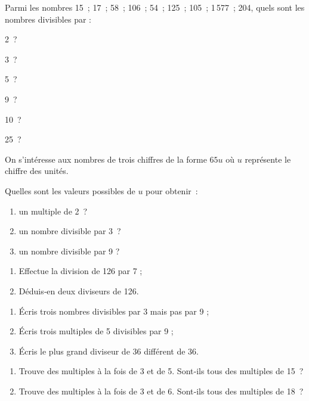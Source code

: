 \begin{exercice}
Parmi les nombres 15 ; 17 ; 58 ; 106 ; 54 ; 125 ; 105 ; 1\,577 ; 204, quels sont les nombres divisibles par :
\begin{colenumerate}{3}     
 \item 2 ?
 \item 3 ?
 \item 5 ?
 \item 9 ?
 \item 10 ?
 \item 25 ?
 \end{colenumerate}
\end{exercice} 

\begin{exercice} On s'intéresse aux nombres de trois chiffres de la forme $65 u$ où $u$ représente le chiffre des unités.

Quelles sont les valeurs possibles de $u$ pour obtenir :
\begin{enumerate}
 \item un multiple de 2 ?
 \item un nombre divisible par 3 ?
 \item un nombre divisible par 9 ?
 \end{enumerate}
\end{exercice} 

\begin{exercice}
\begin{enumerate}
 \item Effectue la division de 126 par 7 ;
 \item Déduis‑en deux diviseurs de 126.
 \end{enumerate}
\end{exercice} 

\begin{exercice}[Diviseurs]
\begin{enumerate}
 \item Écris trois nombres divisibles par 3 mais pas par 9 ;
 \item Écris trois multiples de 5 divisibles par 9 ;
 \item Écris le plus grand diviseur de 36 différent de 36.
 \end{enumerate}
\end{exercice} 

\begin{exercice}[Multiples]
\begin{enumerate}
 \item Trouve des multiples à la fois de 3 et de 5. Sont‑ils tous des multiples de 15 ?
 \item Trouve des multiples à la fois de 3 et de 6. Sont‑ils tous des multiples de 18 ?
 \end{enumerate}
\end{exercice} 


